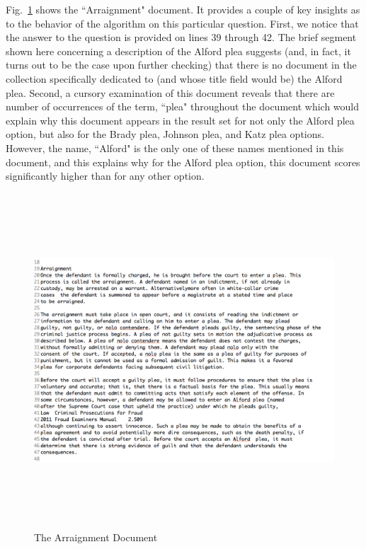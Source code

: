 Fig.~\ref{fig:concept_match_v3_example_document} shows the ``Arraignment" document.  It provides a couple of key insights as to the behavior of the algorithm on this particular question.  First, we notice that the answer to the question is provided on lines 39 through 42.  The brief segment shown here concerning a description of the Alford plea suggests (and, in fact, it turns out to be the case upon further checking) that there is no document in the collection specifically dedicated to (and whose title field would be) the Alford plea.  Second, a cursory examination of this document reveals that there are number of occurrences of the term, ``plea" throughout the document which would explain why this document appears in the result set for not only the Alford plea option, but also for the Brady plea, Johnson plea, and Katz plea options.  However, the name, ``Alford" is the only one of these names mentioned in this document, and this explains why for the Alford plea option, this document scores significantly higher than for any other option.

\begin{figure}
\centering
\vspace{0.75in}
\includegraphics[width=125mm, height=125mm]{concept_match_v3_example_document.png}
\caption{The Arraignment Document}
\label{fig:concept_match_v3_example_document}
\end{figure}


